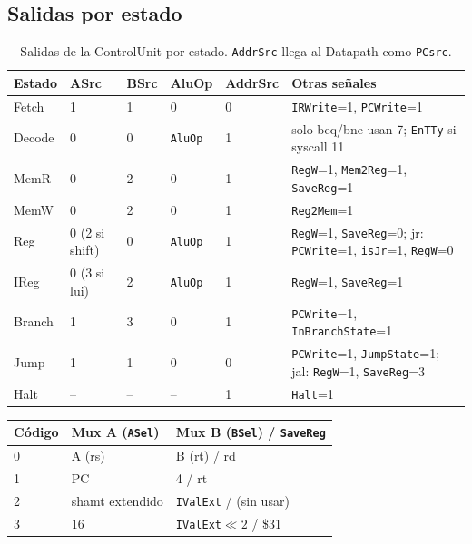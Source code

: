 \documentclass[11pt,a4paper]{article}
\newcommand{\sig}[1]{\texttt{#1}}
\begin{document}
\subsection{Salidas por estado}
\begin{table}[H]
\centering
\small
\begin{tabular}{lllllp{5.2cm}}
\toprule
Estado & ASrc & BSrc & AluOp & AddrSrc & Otras se\~nales\\
\midrule
Fetch  & 1 & 1 & 0 & 0 & \sig{IRWrite}=1, \sig{PCWrite}=1\\
Decode & 0 & 0 & \sig{AluOp} & 1 & solo beq/bne usan 7; \sig{EnTTy} si syscall 11\\
MemR   & 0 & 2 & 0 & 1 & \sig{RegW}=1, \sig{Mem2Reg}=1, \sig{SaveReg}=1\\
MemW   & 0 & 2 & 0 & 1 & \sig{Reg2Mem}=1\\
Reg    & 0 (2 si shift) & 0 & \sig{AluOp} & 1 & \sig{RegW}=1, \sig{SaveReg}=0; jr: \sig{PCWrite}=1, \sig{isJr}=1, \sig{RegW}=0\\
IReg   & 0 (3 si lui) & 2 & \sig{AluOp} & 1 & \sig{RegW}=1, \sig{SaveReg}=1\\
Branch & 1 & 3 & 0 & 1 & \sig{PCWrite}=1, \sig{InBranchState}=1\\
Jump   & 1 & 1 & 0 & 0 & \sig{PCWrite}=1, \sig{JumpState}=1; jal: \sig{RegW}=1, \sig{SaveReg}=3\\
Halt   & -- & -- & -- & 1 & \sig{Halt}=1\\
\bottomrule
\end{tabular}
\caption{Salidas de la ControlUnit por estado. \sig{AddrSrc} llega al Datapath como \sig{PCsrc}.}
\end{table}

\begin{table}[H]
\centering
\small
\begin{tabular}{lll}
\toprule
C\'odigo & Mux A (\sig{ASel}) & Mux B (\sig{BSel}) \quad / \sig{SaveReg}\\
\midrule
0 & A (rs) & B (rt) \quad / rd\\
1 & PC & 4 \quad / rt\\
2 & shamt extendido & \sig{IValExt} \quad / (sin usar)\\
3 & 16 & \sig{IValExt}$\ll 2$ \quad / \$31\\
\bottomrule
\end{tabular}
\end{table}
\end{document}

